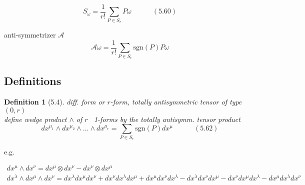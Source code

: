\documentclass{book}
\newtheorem{definition}{Definition}
\begin{document}
\[
S_{\omega} = \frac{1}{r!} \sum_{P \in S_r} P\omega \quad \quad \quad (5.60)
\]

anti-symmetrizer $\mathcal{A}$
\[
\mathcal{A} \omega = \frac{1}{r!} \sum_{ P \in S_r} \text{sgn}{(P)} P\omega
\]




\subsection{ Definitions}

\begin{definition}[5.4] diff. form or $r$-form, totally antisymmetric tensor of type $(0,r)$ \\
define wedge product $\wedge$ of $r$ \, 1-forms by the totally antisymm. tensor product
\begin{equation}
dx^{\mu_1} \wedge dx^{\mu_2} \wedge \dots \wedge dx^{\mu_r} = \sum_{P\in S_r} \text{sgn}{(P)} dx^{\mu} \quad \quad \quad (5.62) 
\end{equation}
\end{definition}











e.g.

\[
\begin{gathered}
  dx^{\mu} \wedge dx^{\nu} = dx^{\mu} \otimes dx^{\nu} - dx^{\nu} \otimes dx^{\mu} \\ 
  dx^{\lambda} \wedge dx^{\mu} \wedge dx^{\nu} = dx^{\lambda} dx^{\mu} dx^{\nu} + dx^{\nu} dx^{\lambda} dx^{\mu} + dx^{\mu} dx^{\nu} dx^{\lambda} - dx^{\lambda} dx^{\nu} dx^{\mu} - dx^{\nu} dx^{\mu} dx^{\lambda} - dx^{\mu} dx^{\lambda} dx^{\nu}
\end{gathered}
\]
\end{document}
